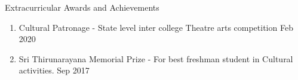 \begin{rSection}{Extracurricular Awards and Achievements} 
\begin{enumerate}[itemsep=-0.5em, leftmargin=-0.8em, rightmargin=0.3em]
    \item []Cultural Patronage - State level inter college Theatre arts competition \hfill Feb 2020
    \item [] Sri Thirunarayana Memorial Prize - For best freshman student in Cultural activities. \hfill Sep 2017

\end{enumerate}
\end{rSection}